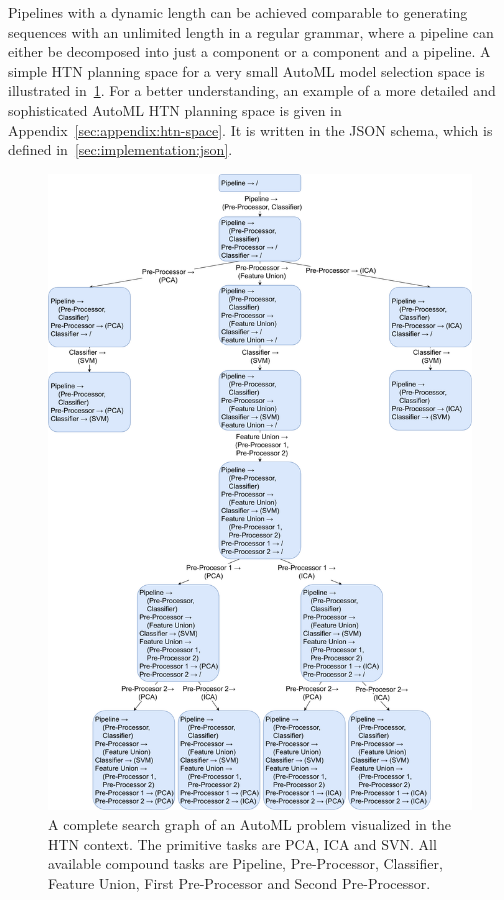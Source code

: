 Pipelines with a dynamic length can be achieved comparable to generating sequences with an unlimited length in a regular grammar, where a pipeline can either be decomposed into just a component or a component and a pipeline.
A simple HTN planning space for a very small AutoML model selection space is illustrated in~\ref{fig:appraoch:htn-automl}.
For a better understanding, an example of a more detailed and sophisticated AutoML HTN planning space is given in Appendix~\ref{sec:appendix:htn-space}.
It is written in the JSON schema, which is defined in~\ref{sec:implementation:json}.
\begin{figure}[ht!]
    \centering
    \includegraphics[width=\textwidth]{gfx/Figures/Approach/HTNAutoML.pdf}
    \caption{A complete search graph of an AutoML problem visualized in the HTN context.
    The primitive tasks are PCA, ICA and SVN.
    All available compound tasks are Pipeline, Pre-Processor, Classifier, Feature Union, First Pre-Processor and Second Pre-Processor.}
    \label{fig:appraoch:htn-automl}
\end{figure}

